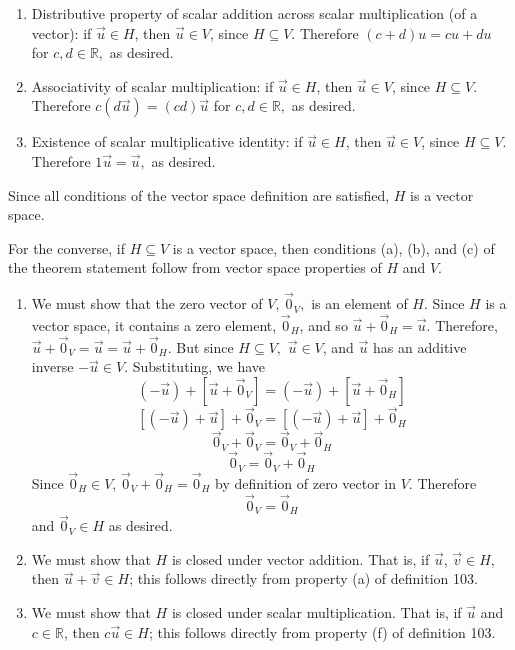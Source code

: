 \documentclass{exam}
\begin{document}
\begin{enumerate}[label=(\alph*)]
    \item Distributive property of scalar addition across scalar multiplication (of a vector): if $\Vec{u}\in H$, then $\Vec{u}\in V$, since $H\subseteq V$. Therefore $(c+d)u=cu+du$ for $c,d\in\mathbb{R},$ as desired.
    
    \item Associativity of scalar multiplication: if $\Vec{u}\in H$, then $\Vec{u}\in V$, since $H\subseteq V$. Therefore $c(d\Vec{u})=(cd)\Vec{u}$ for $c,d\in\mathbb{R},$ as desired.
    
    \item Existence of scalar multiplicative identity: if $\Vec{u}\in H$, then $\Vec{u}\in V$, since $H\subseteq V$. Therefore $1\Vec{u}=\Vec{u},$ as desired. 
\end{enumerate}

Since all conditions of the vector space definition are satisfied, $H$ is a vector space.\newline
\vspace{0.2in}
\newline

For the converse, if $H\subseteq V$ is a vector space, then conditions (a), (b), and (c) of the theorem statement follow from vector space properties of $H$ and $V$. 

\begin{enumerate}[label=(\alph*)]
    \item We must show that the zero vector of $V$, $\Vec{0}_V,$ is an element of $H$. Since $H$ is a vector space, it contains a zero element, $\Vec{0}_H$, and so $\Vec{u}+\Vec{0}_H=\Vec{u}$. Therefore, $\Vec{u}+\Vec{0}_V=\Vec{u}=\Vec{u}+\Vec{0}_H$. But since $H\subseteq V,$ $\Vec{u}\in V$, and $\Vec{u}$ has an additive inverse $-\Vec{u}\in V$. Substituting, we have
    $$(-\Vec{u})+[\Vec{u}+\Vec{0}_V]=(-\Vec{u})+[\Vec{u}+\Vec{0}_H]$$
    $$[(-\Vec{u})+\Vec{u}]+\Vec{0}_V=[(-\Vec{u})+\Vec{u}]+\Vec{0}_H$$
    $$\Vec{0}_V+\Vec{0}_V=\Vec{0}_V+\Vec{0}_H$$
    $$\Vec{0}_V=\Vec{0}_V+\Vec{0}_H$$
    Since $\Vec{0}_H\in V$, $\Vec{0}_V+\Vec{0}_H=\Vec{0}_H$ by definition of zero vector in $V$. Therefore 
    $$\Vec{0}_V=\Vec{0}_H$$ and $\Vec{0}_V\in H$ as desired. 
    \item We must show that $H$ is closed under vector addition. That is, if $\Vec{u}$, $\Vec{v}\in H$, then $\Vec{u}+\Vec{v}\in H$; this follows directly from property (a) of definition 103. 
    \item We must show that $H$ is closed under scalar multiplication. That is, if $\Vec{u}$ and $c\in\mathbb{R}$, then $c\Vec{u}\in H$; this follows directly from property (f) of definition 103. 
\end{enumerate}
\end{document}
